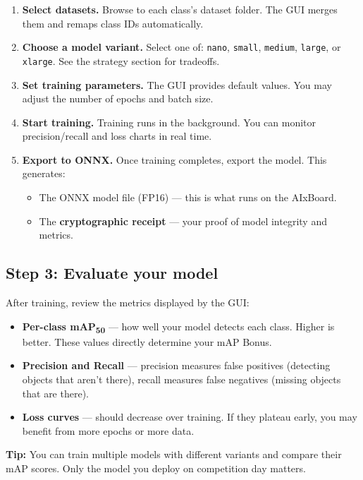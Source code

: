 \documentclass[a4]{article}
\begin{document}
\begin{enumerate}
    \item \textbf{Select datasets.} Browse to each class's dataset folder. The GUI merges them and remaps class IDs automatically.
    \item \textbf{Choose a model variant.} Select one of: \texttt{nano}, \texttt{small}, \texttt{medium}, \texttt{large}, or \texttt{xlarge}. See the strategy section for tradeoffs.
    \item \textbf{Set training parameters.} The GUI provides default values. You may adjust the number of epochs and batch size.
    \item \textbf{Start training.} Training runs in the background. You can monitor precision/recall and loss charts in real time.
    \item \textbf{Export to ONNX.} Once training completes, export the model. This generates:
    \begin{itemize}
        \item The ONNX model file (FP16) --- this is what runs on the AIxBoard.
        \item The \textbf{cryptographic receipt} --- your proof of model integrity and metrics.
    \end{itemize}
\end{enumerate}

\subsection*{Step 3: Evaluate your model}

After training, review the metrics displayed by the GUI:
\begin{itemize}
    \item \textbf{Per-class mAP\textsubscript{50}} --- how well your model detects each class. Higher is better. These values directly determine your mAP Bonus.
    \item \textbf{Precision and Recall} --- precision measures false positives (detecting objects that aren't there), recall measures false negatives (missing objects that are there).
    \item \textbf{Loss curves} --- should decrease over training. If they plateau early, you may benefit from more epochs or more data.
\end{itemize}

\begin{framed}
\textbf{Tip:} You can train multiple models with different variants and compare their mAP scores. Only the model you deploy on competition day matters.
\end{framed}
\end{document}
